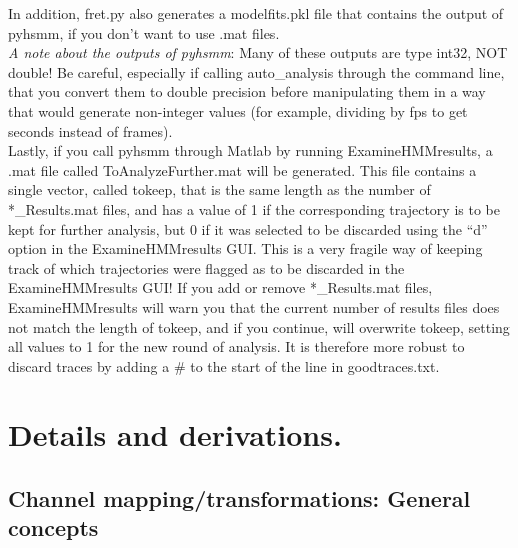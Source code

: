 \documentclass[11pt]{article}
\begin{document}
In addition, fret.py also generates a modelfits.pkl file that contains the output of pyhsmm, if you don't want to use .mat files.\\

{\it A note about the outputs of pyhsmm}: Many of these outputs are type int32, NOT double! Be careful, especially if calling auto\_analysis through the command line, that you convert them to double precision before manipulating them in a way that would generate non-integer values (for example, dividing by fps to get seconds instead of frames).\\

Lastly, if you call pyhsmm through Matlab by running ExamineHMMresults, a .mat file called ToAnalyzeFurther.mat will be generated. This file contains a single vector, called tokeep, that is the same length as the number of *\_Results.mat files, and has a value of 1 if the corresponding trajectory is to be kept for further analysis, but 0 if it was selected to be discarded using the ``d'' option in the ExamineHMMresults GUI. This is a very fragile way of keeping track of which trajectories were flagged as to be discarded in the ExamineHMMresults GUI! If you add or remove *\_Results.mat files, ExamineHMMresults will warn you that the current number of results files does not match the length of tokeep, and if you continue, will overwrite tokeep, setting all values to 1 for the new round of analysis. It is therefore more robust to discard traces by adding a \# to the start of the line in goodtraces.txt.

\newpage

%
%
%

\section{Details and derivations.}\label{sec:Details}

\subsection{Channel mapping/transformations: General concepts}\label{sec:TransformGeneral}
\end{document}
